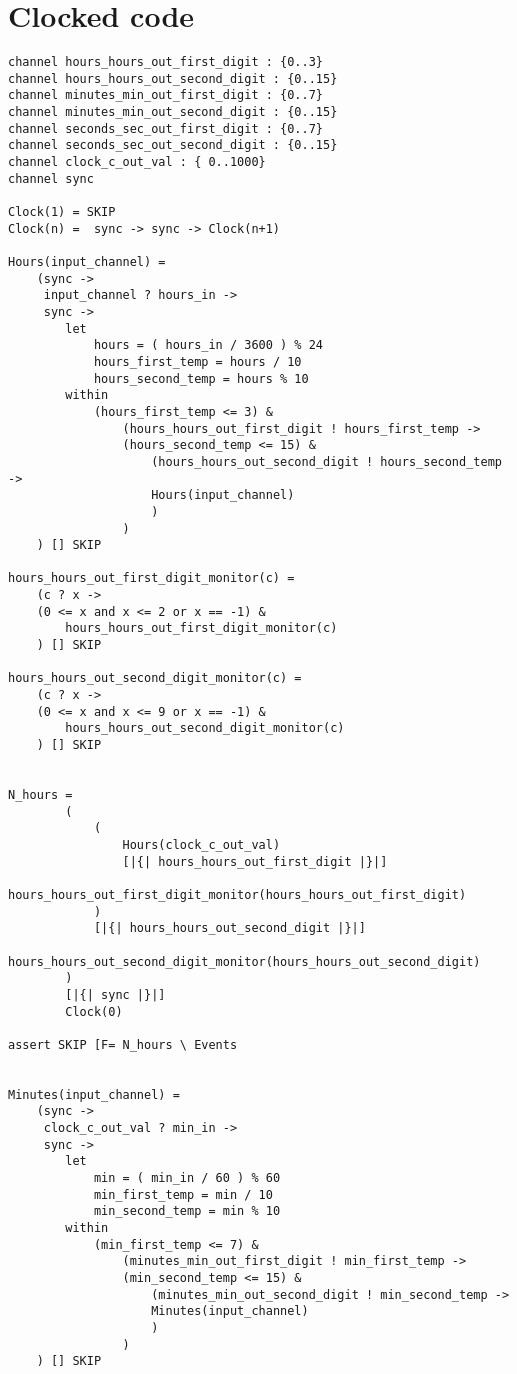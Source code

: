 \section*{Clocked \cspm{} code}
\begin{verbatim}
channel hours_hours_out_first_digit : {0..3}
channel hours_hours_out_second_digit : {0..15}
channel minutes_min_out_first_digit : {0..7}
channel minutes_min_out_second_digit : {0..15}
channel seconds_sec_out_first_digit : {0..7}
channel seconds_sec_out_second_digit : {0..15}
channel clock_c_out_val : { 0..1000}
channel sync

Clock(1) = SKIP
Clock(n) =  sync -> sync -> Clock(n+1)

Hours(input_channel) =
    (sync ->
     input_channel ? hours_in ->
     sync ->
        let
            hours = ( hours_in / 3600 ) % 24
            hours_first_temp = hours / 10
            hours_second_temp = hours % 10
        within
            (hours_first_temp <= 3) &
                (hours_hours_out_first_digit ! hours_first_temp ->
                (hours_second_temp <= 15) &
                    (hours_hours_out_second_digit ! hours_second_temp ->
                    Hours(input_channel)
                    )
                )
    ) [] SKIP

hours_hours_out_first_digit_monitor(c) =
    (c ? x ->
    (0 <= x and x <= 2 or x == -1) &
        hours_hours_out_first_digit_monitor(c)
    ) [] SKIP

hours_hours_out_second_digit_monitor(c) =
    (c ? x ->
    (0 <= x and x <= 9 or x == -1) &
        hours_hours_out_second_digit_monitor(c)
    ) [] SKIP


N_hours =
        (
            (
                Hours(clock_c_out_val)
                [|{| hours_hours_out_first_digit |}|]
                hours_hours_out_first_digit_monitor(hours_hours_out_first_digit)
            )
            [|{| hours_hours_out_second_digit |}|]
            hours_hours_out_second_digit_monitor(hours_hours_out_second_digit)
        )
        [|{| sync |}|]
        Clock(0)

assert SKIP [F= N_hours \ Events


Minutes(input_channel) =
    (sync ->
     clock_c_out_val ? min_in ->
     sync ->
        let
            min = ( min_in / 60 ) % 60
            min_first_temp = min / 10
            min_second_temp = min % 10
        within
            (min_first_temp <= 7) &
                (minutes_min_out_first_digit ! min_first_temp ->
                (min_second_temp <= 15) &
                    (minutes_min_out_second_digit ! min_second_temp ->
                    Minutes(input_channel)
                    )
                )
    ) [] SKIP


\end{verbatim}
